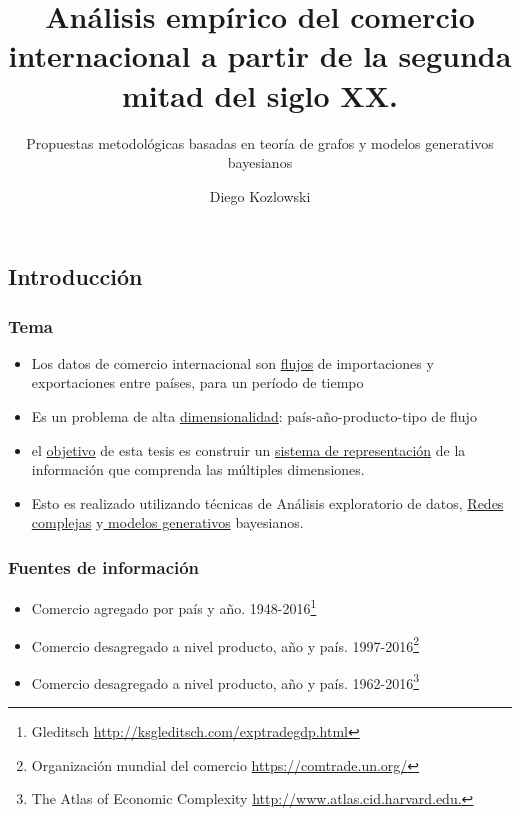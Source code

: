 \documentclass[compress]{beamer}
\title[Defensa de Tesis]{Análisis empírico del comercio internacional a partir de la segunda mitad del siglo XX.}
\subtitle{Propuestas metodológicas basadas en teoría de grafos y modelos generativos
	bayesianos}
\author{Diego Kozlowski}
\institute[Universidad de Buenos Aires]
{
	Universidad de Buenos Aires\\ 
	
	\textit{Master en Data Mining \& Knowledge Discovery} \\
	\medskip
	\textit{Supervisor: Viktoriya Semeshenko}
}
\date{}
\begin{document}
	
	\begin{frame}
	
	\titlepage 
	
\end{frame}



\begin{frame}

\section{Introducción}


\frametitle{Tema}

\begin{itemize}
	
	\item[\faRebel] Los datos de comercio internacional son \underline{flujos} de importaciones y exportaciones entre países, para un período de tiempo 
	\item[\faRebel] Es un problema de alta \underline{dimensionalidad}: país-año-producto-tipo de flujo
	\item[\faRebel] el \underline{objetivo} de esta tesis es construir un \underline{sistema de representación} de la información que comprenda las múltiples dimensiones.
	\item[\faRebel] Esto es realizado utilizando técnicas de Análisis exploratorio de datos, \underline{Redes complejas} y\underline{ modelos generativos} bayesianos. 
\end{itemize}

\end{frame}


\begin{frame}
\frametitle{Fuentes de información}

\begin{itemize}

\item[\faRebel] Comercio agregado por país y año. 1948-2016\footnote{Gleditsch \url{http://ksgleditsch.com/exptradegdp.html}}  
\item[\faRebel] Comercio desagregado a nivel producto, año y país. 1997-2016\footnote{Organización mundial del comercio \url{https://comtrade.un.org/}}
\item[\faRebel] Comercio desagregado a nivel producto, año y país. 1962-2016\footnote{The Atlas of Economic Complexity \url{http://www.atlas.cid.harvard.edu.}}	
\end{itemize}

\end{frame}
\end{document}
